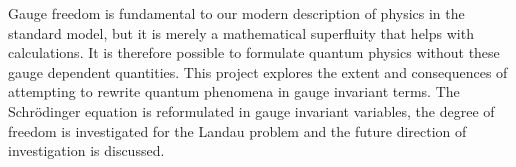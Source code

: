 Gauge freedom is fundamental to our modern description of physics in the
standard model, but it is merely a mathematical superfluity that helps with
calculations. It is therefore possible to formulate quantum physics without
these gauge dependent quantities. This project explores the extent and
consequences of attempting to rewrite quantum phenomena in gauge invariant
terms. The Schr\"odinger equation is reformulated in gauge invariant variables,
the degree of freedom is investigated for the Landau problem and the future
direction of investigation is discussed.
